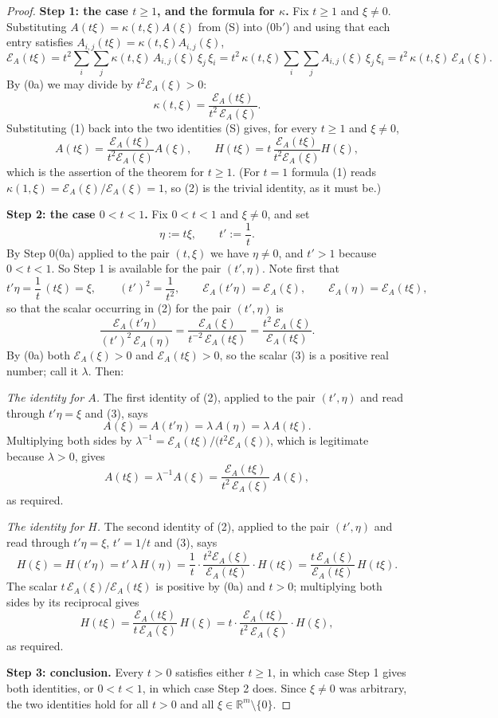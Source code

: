 \begin{proof}
\medskip\noindent\textbf{Step 1: the case $t\ge1$, and the formula for $\kappa$.} Fix
$t\ge1$ and $\xi\ne0$. Substituting $A(t\xi)=\kappa(t,\xi)A(\xi)$ from (S) into
(0b$'$) and using that each entry satisfies
$A_{i,j}(t\xi)=\kappa(t,\xi)A_{i,j}(\xi)$,
\[
 \mathcal E_A(t\xi)=t^{2}\sum_{i}\sum_{j}\kappa(t,\xi)\,A_{i,j}(\xi)\,\xi_j\,\xi_i
  =t^{2}\,\kappa(t,\xi)\sum_{i}\sum_{j}A_{i,j}(\xi)\,\xi_j\,\xi_i
  =t^{2}\,\kappa(t,\xi)\,\mathcal E_A(\xi).
\]
By (0a) we may divide by $t^{2}\mathcal E_A(\xi)>0$:
\[
 \kappa(t,\xi)=\frac{\mathcal E_A(t\xi)}{t^{2}\,\mathcal E_A(\xi)} . \tag{1}
\]
Substituting (1) back into the two identities (S) gives, for every $t\ge1$ and $\xi\ne0$,
\[
 A(t\xi)=\frac{\mathcal E_A(t\xi)}{t^{2}\mathcal E_A(\xi)}A(\xi),
 \qquad
 H(t\xi)=t\,\frac{\mathcal E_A(t\xi)}{t^{2}\mathcal E_A(\xi)}H(\xi), \tag{2}
\]
which is the assertion of the theorem for $t\ge1$. (For $t=1$ formula (1) reads
$\kappa(1,\xi)=\mathcal E_A(\xi)/\mathcal E_A(\xi)=1$, so (2) is the trivial identity, as it
must be.)

\medskip\noindent\textbf{Step 2: the case $0<t<1$.} Fix $0<t<1$ and $\xi\ne0$, and set
\[
 \eta:=t\xi,\qquad t':=\frac1t .
\]
By Step 0(0a) applied to the pair $(t,\xi)$ we have $\eta\ne0$, and $t'>1$ because
$0<t<1$. So Step 1 is available for the pair $(t',\eta)$. Note first that
\[
 t'\eta=\frac1t\,(t\xi)=\xi,\qquad (t')^{2}=\frac1{t^{2}},\qquad
 \mathcal E_A(t'\eta)=\mathcal E_A(\xi),\qquad \mathcal E_A(\eta)=\mathcal E_A(t\xi),
\]
so that the scalar occurring in (2) for the pair $(t',\eta)$ is
\[
 \frac{\mathcal E_A(t'\eta)}{(t')^{2}\,\mathcal E_A(\eta)}
  =\frac{\mathcal E_A(\xi)}{t^{-2}\,\mathcal E_A(t\xi)}
  =\frac{t^{2}\,\mathcal E_A(\xi)}{\mathcal E_A(t\xi)} . \tag{3}
\]
By (0a) both $\mathcal E_A(\xi)>0$ and $\mathcal E_A(t\xi)>0$, so the scalar (3) is a
positive real number; call it $\lambda$. Then:

\emph{The identity for $A$.} The first identity of (2), applied to the pair
$(t',\eta)$ and read through $t'\eta=\xi$ and (3), says
\[
 A(\xi)=A(t'\eta)=\lambda\,A(\eta)=\lambda\,A(t\xi).
\]
Multiplying both sides by $\lambda^{-1}=\mathcal E_A(t\xi)/\big(t^{2}\mathcal E_A(\xi)\big)$,
which is legitimate because $\lambda>0$, gives
\[
 A(t\xi)=\lambda^{-1}A(\xi)=\frac{\mathcal E_A(t\xi)}{t^{2}\,\mathcal E_A(\xi)}\,A(\xi),
\]
as required.

\emph{The identity for $H$.} The second identity of (2), applied to the pair
$(t',\eta)$ and read through $t'\eta=\xi$, $t'=1/t$ and (3), says
\[
 H(\xi)=H(t'\eta)=t'\,\lambda\,H(\eta)
  =\frac1t\cdot\frac{t^{2}\mathcal E_A(\xi)}{\mathcal E_A(t\xi)}\cdot H(t\xi)
  =\frac{t\,\mathcal E_A(\xi)}{\mathcal E_A(t\xi)}\,H(t\xi).
\]
The scalar $t\,\mathcal E_A(\xi)/\mathcal E_A(t\xi)$ is positive by (0a) and $t>0$;
multiplying both sides by its reciprocal gives
\[
 H(t\xi)=\frac{\mathcal E_A(t\xi)}{t\,\mathcal E_A(\xi)}\,H(\xi)
  =t\cdot\frac{\mathcal E_A(t\xi)}{t^{2}\,\mathcal E_A(\xi)}\cdot H(\xi),
\]
as required.

\medskip\noindent\textbf{Step 3: conclusion.} Every $t>0$ satisfies either $t\ge1$, in
which case Step 1 gives both identities, or $0<t<1$, in which case Step 2 does. Since
$\xi\ne0$ was arbitrary, the two identities hold for all $t>0$ and all
$\xi\in\mathbb R^{m}\setminus\{0\}$.
\end{proof}
